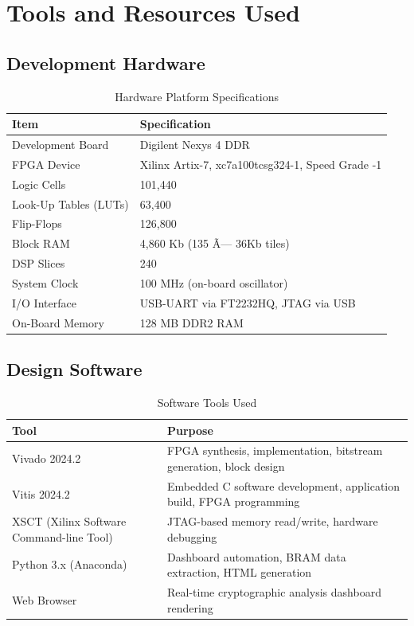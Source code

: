 \documentclass[12pt,a4paper]{article}
\begin{document}
\section{Tools and Resources Used}

\subsection{Development Hardware}

\begin{table}[H]
\centering
\caption{Hardware Platform Specifications}
\begin{tabularx}{\textwidth}{lX}
\toprule
\textbf{Item} & \textbf{Specification} \\
\midrule
Development Board      & Digilent Nexys 4 DDR \\
FPGA Device            & Xilinx Artix-7, xc7a100tcsg324-1, Speed Grade -1 \\
Logic Cells            & 101,440 \\
Look-Up Tables (LUTs)  & 63,400 \\
Flip-Flops             & 126,800 \\
Block RAM              & 4,860 Kb (135 Ã— 36Kb tiles) \\
DSP Slices             & 240 \\
System Clock           & 100 MHz (on-board oscillator) \\
I/O Interface          & USB-UART via FT2232HQ, JTAG via USB \\
On-Board Memory        & 128 MB DDR2 RAM \\
\bottomrule
\end{tabularx}
\end{table}

\subsection{Design Software}

\begin{table}[H]
\centering
\caption{Software Tools Used}
\begin{tabularx}{\textwidth}{lX}
\toprule
\textbf{Tool} & \textbf{Purpose} \\
\midrule
Vivado 2024.2           & FPGA synthesis, implementation, bitstream generation, block design \\
Vitis 2024.2            & Embedded C software development, application build, FPGA programming \\
XSCT (Xilinx Software Command-line Tool) & JTAG-based memory read/write, hardware debugging \\
Python 3.x (Anaconda)   & Dashboard automation, BRAM data extraction, HTML generation \\
Web Browser             & Real-time cryptographic analysis dashboard rendering \\
\bottomrule
\end{tabularx}
\end{table}
\end{document}
